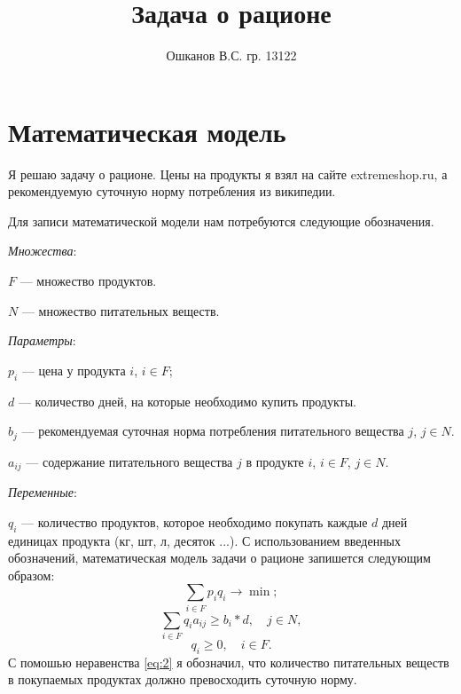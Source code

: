 \documentclass[]{article}
\title{Задача о рационе}
\author{Ошканов В.С. гр. 13122}
\begin{document}
\maketitle
\section{Математическая модель}
Я решаю задачу о рационе. Цены на продукты я взял на сайте extremeshop.ru, а рекомендуемую суточную норму потребления из википедии.

Для записи математической модели нам потребуются следующие обозначения.
\par
\textit{Множества}:
\par\noindent
$F$ --- множество продуктов.
\par\noindent
$N$ --- множество питательных веществ.
\par
\textit{Параметры}:
\par\noindent
$p_i$ --- цена у продукта $i$, $i\in F$;
\par\noindent
$d$ --- количество дней, на которые необходимо купить продукты.
\par\noindent
$b_{j}$ --- рекомендуемая суточная норма потребления питательного вещества $j$, $j\in N$.
\par\noindent
$a_{ij}$ --- содержание питательного вещества $j$ в продукте $i$, $i\in F$, $j\in N$.
\par
\textit{Переменные}:
\par\noindent
$q_i$ --- количество продуктов, которое необходимо покупать каждые $d$ дней
единицах продукта (кг, шт, л, десяток ...).
С использованием введенных обозначений, математическая модель задачи о рационе
запишется следующим образом:
\begin{equation}
\sum_{i\in F}p_iq_i\rightarrow\min;
\end{equation}
\begin{equation}\label{eq:2}
	\sum_{i\in F}
			q_ia_{ij} \geq b_i*d,\quad j\in N,
\end{equation}
\begin{equation}
      q_i \geq 0,\quad i\in F.
\end{equation}
С помошью неравенства \eqref{eq:2} я обозначил, что количество питательных веществ в покупаемых продуктах должно превосходить суточную норму.
\end{document}
